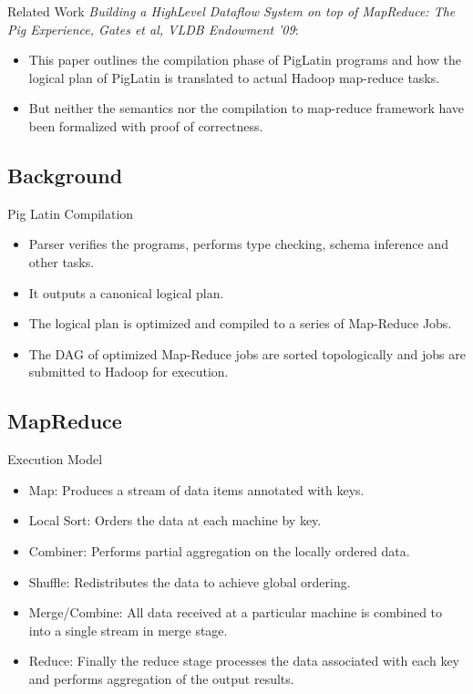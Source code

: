 \begin{frame}{Related Work}
\emph{Building a HighLevel Dataflow System on top of MapReduce: The Pig Experience, Gates et al, VLDB Endowment '09}: 
\begin{itemize}
	\item This paper outlines the compilation phase of PigLatin programs and how the logical plan of PigLatin is translated to actual Hadoop map-reduce tasks. 
	\item But neither the semantics nor the compilation to map-reduce framework have been formalized with proof of correctness. 
\end{itemize}
\end{frame}

\subsection{Background}
\begin{frame}{Pig Latin Compilation}
\begin{itemize}
	\item Parser verifies the programs, performs type checking, schema inference and other tasks.
	\item It outputs a canonical logical plan.
	\item The logical plan is optimized and compiled to a series of Map-Reduce Jobs.
	\item The DAG of optimized Map-Reduce jobs are sorted topologically and jobs are submitted to Hadoop for execution. 
\end{itemize}
\end{frame}

\subsection{MapReduce}
\begin{frame}{Execution Model}
\begin{itemize}
	\item Map: Produces a stream of data items annotated with keys.
	\item Local Sort: Orders the data at each machine by key.
	\item Combiner: Performs partial aggregation on the locally ordered data.
	\item Shuffle: Redistributes the data to achieve global ordering.
	\item Merge/Combine: All data received at a particular machine is combined to into a single stream in merge stage.
	\item Reduce: Finally the reduce stage processes the data associated with each key and performs aggregation of the output results.
\end{itemize}
\end{frame}

